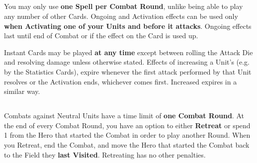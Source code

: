 \begin{multicols*}{2}
\subsection*{}
You may only use \textbf{one Spell per Combat Round}, unlike being able to play any number of other Cards.
Ongoing  and  Activation effects can be used only \textbf{when Activating one of your Units and before it attacks}.
Ongoing effects last until end of Combat or if the effect on the Card is used up.\par
Instant  Cards may be played \textbf{at any time} except between rolling the Attack Die and resolving damage unless otherwise stated.
Effects of increasing a Unit's  (e.g. by the Statistics Cards), expire whenever the first attack performed by that Unit resolves or the Activation ends, whichever comes first.
Increased  expires in a similar way.

\vspace*{\fill}

\subsection*{}
Combats against Neutral Units have a time limit of \textbf{one Combat Round}.
At the end of every Combat Round, you have an option to either \textbf{Retreat} or spend 1  from the Hero that started the Combat in order to play another Round.
When you Retreat, end the Combat, and move the Hero that started the Combat back to the Field they \textbf{last Visited}.
Retreating has no other penalties.

\end{multicols*}

